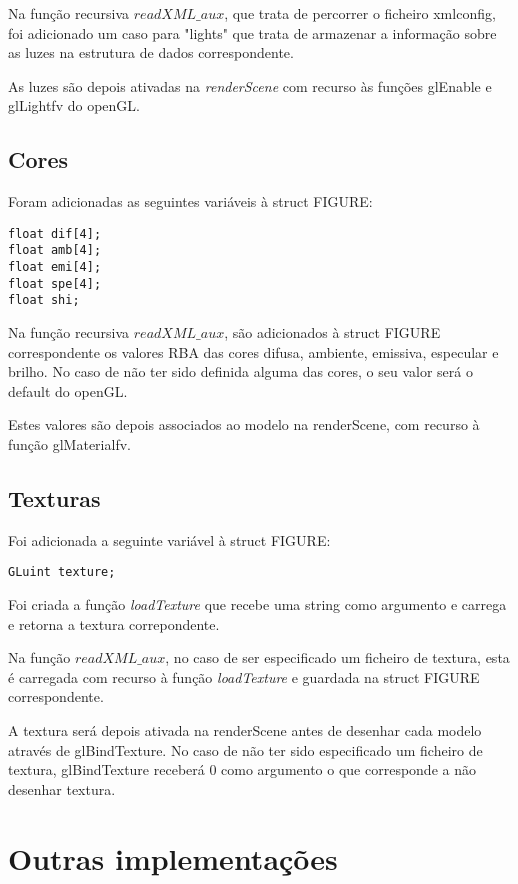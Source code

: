 \documentclass[11pt,a4paper]{report}
\begin{document}
Na função recursiva {$readXML\_aux$}, que trata de percorrer o ficheiro xmlconfig, foi adicionado um caso para "lights" que trata de armazenar a informação sobre as luzes na estrutura de dados correspondente.

As luzes são depois ativadas na \emph{renderScene} com recurso às funções glEnable e glLightfv do openGL.

\subsection{Cores}
Foram adicionadas as seguintes variáveis à struct FIGURE:
\begin{lstlisting}[style = code]
float dif[4];
float amb[4];
float emi[4];
float spe[4];
float shi;
\end{lstlisting}

Na função recursiva {$readXML\_aux$}, são adicionados à struct FIGURE correspondente os valores RBA das cores difusa, ambiente, emissiva, especular e brilho.
No caso de não ter sido definida alguma das cores, o seu valor será o default do openGL.

Estes valores são depois associados ao modelo na renderScene, com recurso à função glMaterialfv.

\subsection{Texturas}
Foi adicionada a seguinte variável à struct FIGURE:

\begin{lstlisting}[style = code]
GLuint texture;
\end{lstlisting}

Foi criada a função \emph{loadTexture} que recebe uma string como argumento e carrega e retorna a textura correpondente.

Na função {$readXML\_aux$}, no caso de ser especificado um ficheiro de textura, esta é carregada com recurso à função \emph{loadTexture} e guardada na struct FIGURE correspondente.

A textura será depois ativada na renderScene antes de desenhar cada modelo através de glBindTexture. No caso de não ter sido especificado um ficheiro de textura, glBindTexture receberá 0 como argumento o que corresponde a não desenhar textura.

\section{Outras implementações}
\end{document}
